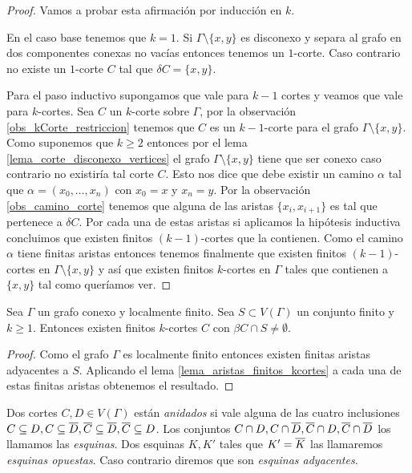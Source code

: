 \documentclass[tesis.tex]{subfiles}
\begin{document}
\begin{proof}
	Vamos a probar esta afirmación por inducción en $k$.
	
	En el caso base tenemos que $k=1$. 
	Si $\Gamma \setminus \{x,y\}$ es disconexo y separa al grafo en dos componentes conexas no vacías entonces tenemos un $1$-corte. 
	Caso contrario no existe un $1$-corte $C$ tal que $\delta C = \{x,y\}$.
	
	Para el paso inductivo supongamos que vale para $k-1$ cortes y veamos que vale para $k$-cortes.
	Sea $C$ un $k$-corte sobre $\Gamma$, por la observación \ref{obs_kCorte_restriccion} tenemos que $C$ es un $k-1$-corte para el grafo $\Gamma \setminus \{x,y\}$.
	Como suponemos que $k \ge 2$ entonces por el lema \ref{lema_corte_disconexo_vertices} el grafo $\Gamma \setminus \{x,y\}$ tiene que ser conexo caso contrario no existiría tal corte $C$.
	Esto nos dice que debe existir un camino $\alpha$ tal que $\alpha = (x_{0}, \dots, x_{n})$ con $x_{0} = x$ y $x_{n} = y$.
	Por la observación \ref{obs_camino_corte} tenemos que alguna de las aristas $\{x_{i},x_{i+1}\}$ es tal que pertenece a $\delta C$.
	Por cada una de estas aristas si aplicamos la hipótesis inductiva concluimos que existen finitos $(k-1)$-cortes que la contienen.
	Como el camino $\alpha$ tiene finitas aristas entonces tenemos finalmente que existen finitos $(k-1)$-cortes en $\Gamma \setminus \{x,y\}$ y así que existen finitos $k$-cortes en $\Gamma$ tales que contienen a $\{x,y\}$ tal como queríamos ver.
	
\end{proof}




\begin{coro}\label{lema_finitos_kcortes}
	Sea $\Gamma$ un grafo conexo y localmente finito.
	Sea $S \subset V(\Gamma)$ un conjunto finito y $k\ge 1$.
	Entonces existen finitos $k$-cortes $C$ con $\beta C \cap S \neq \emptyset$.
\end{coro}	

\begin{proof}
	Como el grafo $\Gamma$ es localmente finito entonces existen finitas aristas adyacentes a $S$.
	Aplicando el lema \ref{lema_aristas_finitos_kcortes} a cada una de estas finitas aristas obtenemos el resultado.	
\end{proof}
	





\begin{deff}
	Dos cortes $C,D \in V(\Gamma)$ están \emph{anidados} si vale alguna de las cuatro inclusiones $C \subseteq D, C \subseteq \overline D, \overline C \subseteq \overline D, \overline C \subseteq D$.
	Los conjuntos $C \cap D, C \cap \overline D, \overline C \cap D, \overline C \cap \overline D$ los llamamos las \emph{esquinas}.
	Dos esquinas $K,K'$ tales que $K' = \overline K$ las llamaremos \emph{esquinas opuestas}.
	Caso contrario diremos que son \emph{esquinas adyacentes}.
\end{deff}
\end{document}
